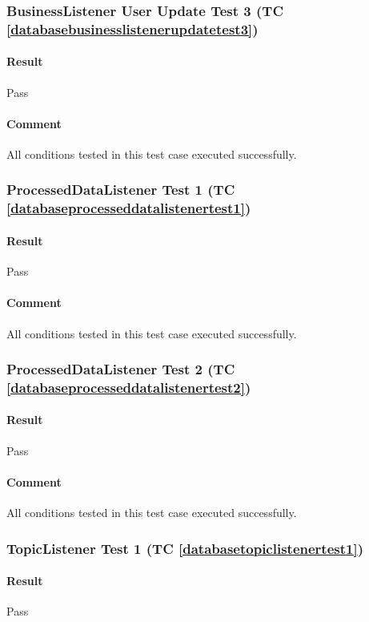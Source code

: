 \documentclass[hidelinks,english]{article}
\begin{document}
			\subsubsection{BusinessListener User Update Test 3 (TC \ref{databasebusinesslistenerupdatetest3})}
				\paragraph{Result} Pass
				\paragraph{Comment} All conditions tested in this test case executed successfully.
			
			\subsubsection{ProcessedDataListener Test 1 (TC \ref{databaseprocesseddatalistenertest1})}
				\paragraph{Result} Pass
				\paragraph{Comment} All conditions tested in this test case executed successfully.
			
			\subsubsection{ProcessedDataListener Test 2 (TC \ref{databaseprocesseddatalistenertest2})}
				\paragraph{Result} Pass
				\paragraph{Comment} All conditions tested in this test case executed successfully.
			
			\subsubsection{TopicListener Test 1 (TC \ref{databasetopiclistenertest1})}
				\paragraph{Result} Pass
\end{document}
